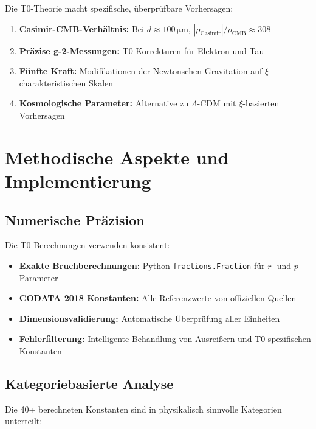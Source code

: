 	Die T0-Theorie macht spezifische, überprüfbare Vorhersagen:
	
	\begin{enumerate}
		\item \textbf{Casimir-CMB-Verhältnis:} Bei $d \approx 100\,\si{\micro\meter}$, $|\rho_{\text{Casimir}}|/\rho_{\text{CMB}} \approx 308$
		\item \textbf{Präzise g-2-Messungen:} T0-Korrekturen für Elektron und Tau
		\item \textbf{Fünfte Kraft:} Modifikationen der Newtonschen Gravitation auf $\xi$-charakteristischen Skalen
		\item \textbf{Kosmologische Parameter:} Alternative zu $\Lambda$-CDM mit $\xi$-basierten Vorhersagen
	\end{enumerate}
	
	\section{Methodische Aspekte und Implementierung}
	
	\subsection{Numerische Präzision}
	
	Die T0-Berechnungen verwenden konsistent:
	
	\begin{itemize}
		\item \textbf{Exakte Bruchberechnungen:} Python \texttt{fractions.Fraction} für $r$- und $p$-Parameter
		\item \textbf{CODATA 2018 Konstanten:} Alle Referenzwerte von offiziellen Quellen
		\item \textbf{Dimensionsvalidierung:} Automatische Überprüfung aller Einheiten
		\item \textbf{Fehlerfilterung:} Intelligente Behandlung von Ausreißern und T0-spezifischen Konstanten
	\end{itemize}
	
	\subsection{Kategoriebasierte Analyse}
	
	Die 40+ berechneten Konstanten sind in physikalisch sinnvolle Kategorien unterteilt:
	
